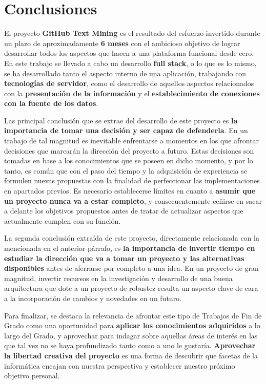 
\section{Conclusiones}

El proyecto \textbf{GitHub Text Mining} es el resultado del esfuerzo invertido durante un plazo de aproximadamente \textbf{6 meses} con el ambicioso objetivo de lograr desarrollar todos los aspectos que hacen a una plataforma funcional desde cero. En este trabajo se llevado a cabo un desarrollo \textbf{full stack}, o lo que es lo mismo, se ha desarrollado tanto el aspecto interno de una aplicación, trabajando con \textbf{tecnologías de servidor}, como el desarrollo de aquellos aspectos relacionados con la \textbf{presentación de la información} y el \textbf{establecimiento de conexiones con la fuente de los datos}.

Las principal conclusión que se extrae del desarrollo de este proyecto es \textbf{la importancia de tomar una decisión y ser capaz de defenderla}. En un trabajo de tal magnitud es inevitable enfrentarse a momentos en los que afrontar decisiones que marcarán la dirección del proyecto a futuro. Estas decisiones son tomadas en base a los conocimientos que se poseen en dicho momento, y por lo tanto, es común que con el paso del tiempo y la adquisición de experiencia se formulen nuevas propuestas con la finalidad de perfeccionar las implementaciones en apartados previos. Es necesario establecerse límites en cuanto a \textbf{asumir que un proyecto nunca va a estar completo}, y consecuentemente ceñirse en sacar a delante los objetivos propuestos antes de tratar de actualizar aspectos que actualmente cumplen con su función.

La segunda conclusión extraída de este proyecto, directamente relacionada con la mencionada en el anterior párrafo, es \textbf{la importancia de invertir tiempo en estudiar la dirección que va a tomar un proyecto y las alternativas disponibles} antes de aferrarse por completo a una idea. En un proyecto de gran magnitud, invertir recursos en la investigación y desarrollo de una buena arquitectura que dote a un proyecto de robustez resulta un aspecto clave de cara a la incorporación de cambios y novedades en un futuro.

Para finalizar, se destaca la relevancia de afrontar este tipo de Trabajos de Fin de Grado como una oportunidad para \textbf{aplicar los conocimientos adquiridos} a lo largo del Grado, y aprovechar para indagar sobre aquellas áreas de interés en las que tal vez no se haya profundizado tanto como a uno le gustaría. \textbf{Aprovechar la libertad creativa del proyecto} es una forma de descubrir que facetas de la informática encajan con nuestra perspectiva y establecer nuestro próximo objetivo personal.

